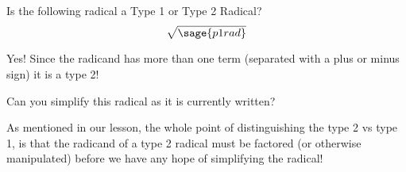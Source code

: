 \documentclass{ximera}
\begin{document}
\begin{problem}
    Is the following radical a Type 1 or Type 2 Radical?
    \[
        \sqrt{\sage{p1rad}}
    \]
    
    \begin{multipleChoice}
    \end{multipleChoice}
    \begin{feedback}[correct]
        Yes! Since the radicand has more than one term (separated with a plus or minus sign) it is a type 2!
    \end{feedback}
    
    \begin{problem}
        Can you simplify this radical as it is currently written?
        \begin{multipleChoice}
        \end{multipleChoice}
        \begin{feedback}[correct]
            As mentioned in our lesson, the whole point of distinguishing the type 2 vs type 1, is that the radicand of a type 2 radical must be factored (or otherwise manipulated) before we have any hope of simplifying the radical!
        \end{feedback}
        
    \end{problem}
\end{problem}
\end{document}
